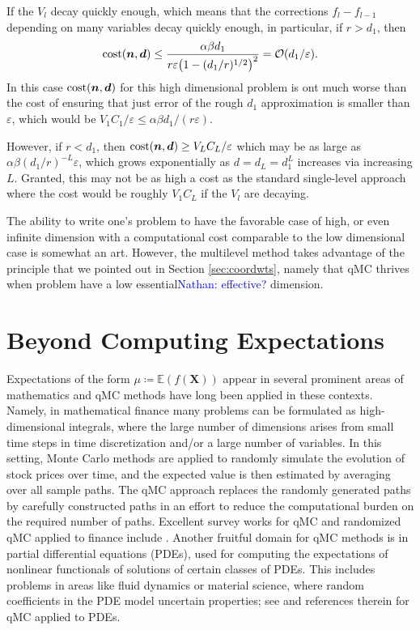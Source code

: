 \documentclass{svproc}
\newcommand{\NKNote}[1]{{\textcolor{blue}{Nathan: #1}}}
\begin{document}
If the $V_l$ decay quickly enough, which means that the corrections $f_l - f_{l-1}$ depending on many variables decay quickly enough, in particular, if $r > d_1$, then 
\begin{equation}
         \text{cost}({\boldsymbol{n}},{\boldsymbol{d}}) \le \frac{\alpha \beta d_1} {r \varepsilon \bigl( 1 - (d_1/r)^{1/2}\bigr)^2} = \mathcal{O}(d_1/\varepsilon).
\end{equation}
In this case $\text{cost}({\boldsymbol{n}},{\boldsymbol{d}})$ for this high dimensional problem is ont much worse than the cost of ensuring that just error of the rough $d_1$ approximation is smaller than $\varepsilon$, which would be $V_1C_1/\varepsilon \le \alpha \beta d_1/(r\varepsilon)$.  

However, if $r < d_1$, then $\text{cost}({\boldsymbol{n}},{\boldsymbol{d}}) \ge V_LC_L/\varepsilon$ which may be as large as $\alpha \beta (d_1/r)^{-L}{\varepsilon}$, which grows exponentially as $d = d_L = d_1^L$ increases via increasing $L$.  Granted, this may not be as high a cost as the standard single-level approach where the cost would be roughly $V_1C_L$ if the $V_l$ are decaying.

The ability to write one's problem to have the favorable case of high, or even infinite dimension with a computational cost comparable to the low dimensional case is somewhat an art.  However, the multilevel method takes advantage of the principle that we pointed out in Section \ref{sec:coordwts}, namely that qMC thrives when problem have a low essential\NKNote{effective?} dimension.  

\section{Beyond Computing Expectations} \label{sec:beyond}

Expectations of the form $\mu \coloneqq \mathbb{E}(f(\mathbf{X}))$ appear in several prominent areas of mathematics and qMC methods have long been applied in these contexts. Namely, in mathematical finance many problems can be formulated as high-dimensional integrals, where the large number of dimensions arises from small time steps in time discretization and/or a large number of variables. In this setting, Monte Carlo methods are applied to randomly simulate the evolution of stock prices over time, and the expected value is then estimated by averaging over all sample paths. The qMC approach replaces the randomly generated paths by carefully constructed paths in an effort to reduce the computational burden on the required number of paths. Excellent survey works for qMC and randomized qMC applied to finance include \cite{CafMor96,LEc09,Lem04a,Jae02,wangsloan05}. Another fruitful domain for qMC methods is in partial differential equations (PDEs), used for computing the expectations of nonlinear functionals of solutions of certain classes of PDEs. This includes problems in areas like fluid dynamics or material science, where random coefficients in the PDE model uncertain properties; see \cite{KuoNuy16a,KuoEtal12a,GraEtal11a} and references therein for qMC applied to PDEs.
\end{document}
